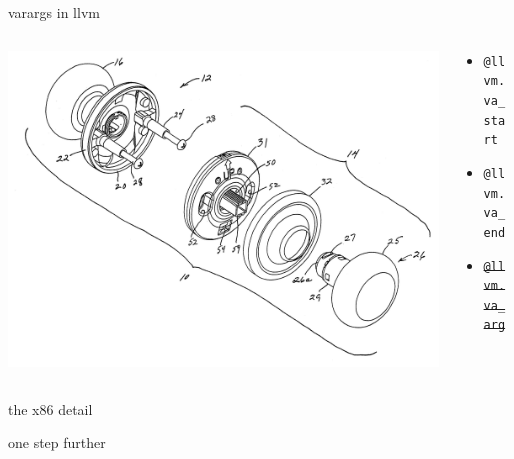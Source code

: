 \documentclass{beamer}
\begin{document}
\begin{frame}{varargs in llvm}
  \begin{columns}
    \begin{column}[b]{5.5cm}
      \includegraphics[scale=0.05]{variable-knob}
    \end{column}
    \begin{column}[b]{4.5cm}
      \begin{itemize}
      \item[] \texttt{@llvm.va\_start}
      \item[] \texttt{@llvm.va\_end}
      \item[] \texttt{\sout{@llvm.va\_arg}}
      \end{itemize}
    \end{column}
  \end{columns}
\end{frame}

\begin{frame}{the x86 detail}
  
  \vfill
  
\end{frame}

\begin{frame}{one step further}
  
\end{frame}
\end{document}
